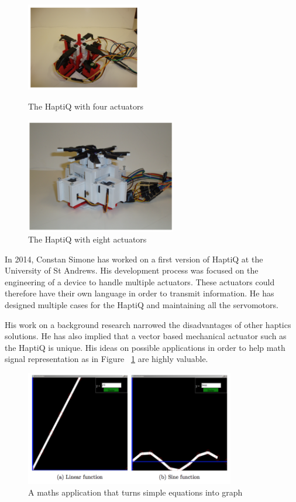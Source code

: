 \begin{figure}[!ht]
	\begin{minipage}[c]{.45\linewidth}
		\centering
		\includegraphics[width=5cm]{figures/simone_haptiq_4.png}
		\caption{The HaptiQ with four actuators}
	\end{minipage}
	\begin{minipage}[c]{.45\linewidth}
		\centering
		\includegraphics[height=5cm]{figures/simone_haptiq_8.png}
		\caption{The HaptiQ with eight actuators}
	\end{minipage}
\end{figure}

In 2014, Constan Simone has worked on a first version of HaptiQ at the
University of St Andrews. His development process was focused on the
engineering of a device to handle multiple actuators. These actuators
could therefore have their own language in order to transmit
information. He has designed multiple cases for the HaptiQ and
maintaining all the servomotors.

His work on a background research narrowed the disadvantages of other
haptics solutions. He has also implied that a vector based mechanical
actuator such as the HaptiQ is unique. His ideas on possible
applications in order to help math signal representation as in Figure ~\ref{fig:simone-math} are highly valuable.

\begin{figure}[!ht]
	\centering
	\includegraphics[height=5cm]{figures/simone_maths.png}
	\caption{A maths application that turns simple equations into graph\label{fig:simone-math}}
\end{figure}

